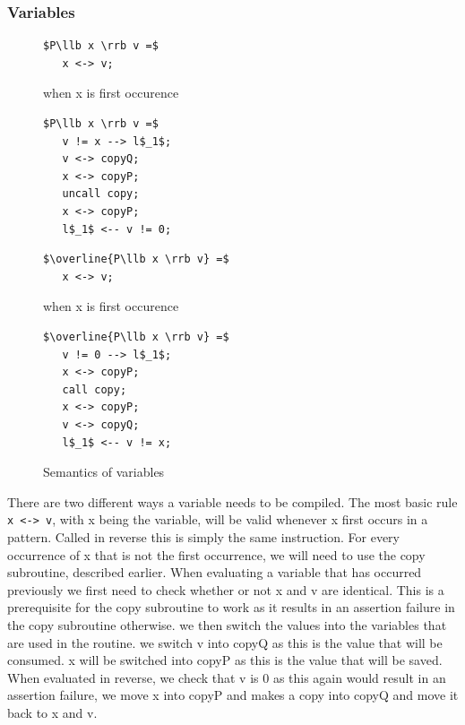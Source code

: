 \documentclass[a4paper]{article}
\begin{document}
\subsubsection{Variables}
\label{sec:orge509945}
\begin{figure}[!htb]
\begin{minipage}{0.4\textwidth}
\begin{lstlisting}
$P\llb x \rrb v =$
   x <-> v;
\end{lstlisting}
when x is first occurence
\begin{lstlisting}
$P\llb x \rrb v =$
   v != x --> l$_1$;
   v <-> copyQ;
   x <-> copyP;
   uncall copy;
   x <-> copyP;
   l$_1$ <-- v != 0;
\end{lstlisting}
\end{minipage}
\qquad
\begin{minipage}{0.4\textwidth}
\begin{lstlisting}
$\overline{P\llb x \rrb v} =$
   x <-> v;
\end{lstlisting}
when x is first occurence
\begin{lstlisting}
$\overline{P\llb x \rrb v} =$
   v != 0 --> l$_1$;
   x <-> copyP;
   call copy;
   x <-> copyP;
   v <-> copyQ;
   l$_1$ <-- v != x;
\end{lstlisting}
\end{minipage}

\caption{Semantics of variables}
\label{variables}
\end{figure}
There are two different ways a variable needs to be compiled. The most basic rule \texttt{x <-> v}, with x being the variable, will be valid whenever x first occurs in a pattern. Called in reverse this is simply the same instruction. For every occurrence of x that is not the first occurrence, we will need to use the copy subroutine, described earlier. When evaluating a variable that has occurred previously we first need to check whether or not x and v are identical. This is a prerequisite for the copy subroutine to work as it results in an assertion failure in the copy subroutine otherwise. we then switch the values into the variables that are used in the routine. we switch v into copyQ as this is the value that will be consumed. x will be switched into copyP as this is the value that will be saved. When evaluated in reverse, we check that v is 0 as this again would result in an assertion failure, we move x into copyP and makes a copy into copyQ and move it back to x and v.
\end{document}
